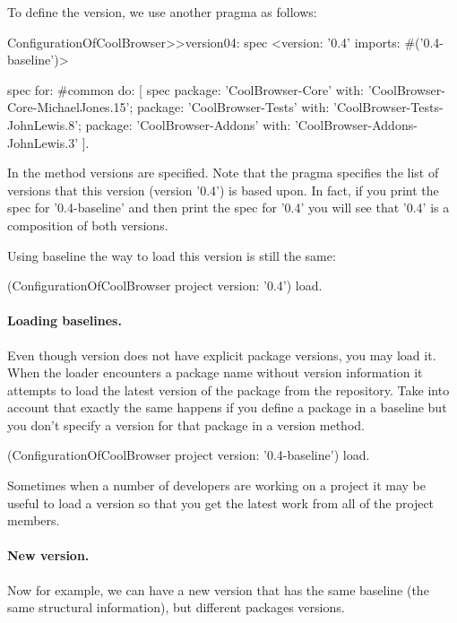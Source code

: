 \documentclass[a4paper,10pt,twoside]{book}
\begin{document}
To define the version, we use another pragma  as follows:

\begin{code}{}
ConfigurationOfCoolBrowser>>version04: spec 
	<version: '0.4' imports: #('0.4-baseline')>
	
	spec for: #common do: [
		spec 
			package: 'CoolBrowser-Core' with: 'CoolBrowser-Core-MichaelJones.15';
			package: 'CoolBrowser-Tests' with: 'CoolBrowser-Tests-JohnLewis.8';
			package: 'CoolBrowser-Addons' with: 'CoolBrowser-Addons-JohnLewis.3' ].
\end{code}


In the method  versions are specified. Note that the pragma  specifies the list of versions that this version (version '0.4') is based upon. In fact, if you print the spec for '0.4-baseline' and then print the spec for '0.4' you will see that '0.4' is a composition of both versions.

Using baseline the way to load this version is still the same:
\begin{code}{}
(ConfigurationOfCoolBrowser project version: '0.4') load.
\end{code}


\paragraph{Loading baselines.}
Even though version  does not have explicit package versions, you may load it. When the loader encounters a package name without version information it attempts to load the latest version of the package from the repository. Take into account that exactly the same happens if you define a package in a baseline but you don't specify a version for that package in a version method. 
 
\begin{code}{}
(ConfigurationOfCoolBrowser project version: '0.4-baseline') load.
\end{code}

Sometimes when a number of developers are working on a project it may be useful to load a  version so that you get the latest work from all of the project members.


\paragraph{New version.}
Now for example, we can have a new version  that has the same baseline (the same structural information), but different packages versions. 
\end{document}
